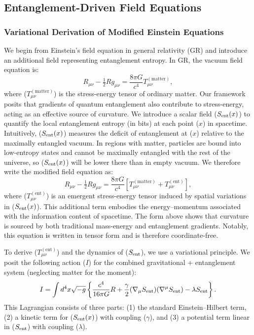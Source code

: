 \documentclass[11pt]{article}
\begin{document}
\subsection{Entanglement-Driven Field Equations} %

\subsubsection{Variational Derivation of Modified Einstein Equations}

We begin from Einstein’s field equation in general relativity (GR) and introduce an additional field representing entanglement entropy. In GR, the vacuum field equation is: 
\begin{equation*}
R_{\mu\nu} - \tfrac{1}{2}R g_{\mu\nu} = \frac{8\pi G}{c^4} T_{\mu\nu}^{(\text{matter})}, 
\end{equation*}
where ($T_{\mu\nu}^{(\text{matter})}$) is the stress-energy tensor of ordinary matter. Our framework posits that gradients of quantum entanglement also contribute to stress-energy, acting as an effective source of curvature. We introduce a scalar field ($S_{\rm ent}(x)$) to quantify the local entanglement entropy (in bits) at each point ($x$) in spacetime. Intuitively, ($S_{\rm ent}(x)$) measures the deficit of entanglement at ($x$) relative to the maximally entangled vacuum. In regions with matter, particles are bound into low-entropy states and cannot be maximally entangled with the rest of the universe, so ($S_{\rm ent}(x)$) will be lower there than in empty vacuum. We therefore write the modified field equation as: 
\begin{equation*}
R_{\mu\nu} - \tfrac{1}{2}R g_{\mu\nu} = \frac{8\pi G}{c^4} \left[ T_{\mu\nu}^{(\text{matter})} + T_{\mu\nu}^{(\text{ent})} \right], 
\end{equation*}
where ($T_{\mu\nu}^{(\text{ent})}$) is an emergent stress-energy tensor induced by spatial variations in ($S_{\rm ent}(x)$). This additional term embodies the energy–momentum associated with the information content of spacetime. The form above shows that curvature is sourced by both traditional mass-energy and entanglement gradients. Notably, this equation is written in tensor form and is therefore coordinate-free.

To derive ($T_{\mu\nu}^{(\text{ent})}$) and the dynamics of ($S_{\rm ent}$), we use a variational principle. We posit the following action ($I$) for the combined gravitational + entanglement system (neglecting matter for the moment): 
\begin{equation*}
I = \int d^4x \sqrt{-g} \left\{ \frac{c^4}{16\pi G}R + \frac{\gamma}{2}(\nabla_\mu S_{\rm ent})(\nabla^\mu S_{\rm ent}) - \lambda S_{\rm ent} \right\}. 
\end{equation*}
This Lagrangian consists of three parts: (1) the standard Einstein–Hilbert term, (2) a kinetic term for ($S_{\rm ent}(x)$) with coupling ($\gamma$), and (3) a potential term linear in ($S_{\rm ent}$) with coupling ($\lambda$).
\end{document}
